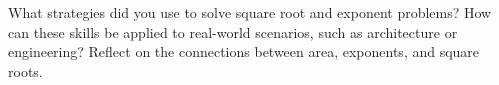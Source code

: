 \documentclass[12pt]{article}
\begin{document}
\vspace{1em}

\begin{tcolorbox}[colframe=black!60, colback=white, 
coltitle=black, colbacktitle=black!15, fonttitle=\bfseries\Large, 
title=Reflection, halign title=center, left=10pt, right=10pt, top=10pt, bottom=100pt]
What strategies did you use to solve square root and exponent problems? How can these skills be applied to real-world scenarios, such as architecture or engineering? Reflect on the connections between area, exponents, and square roots.
\end{tcolorbox}
\end{document}

